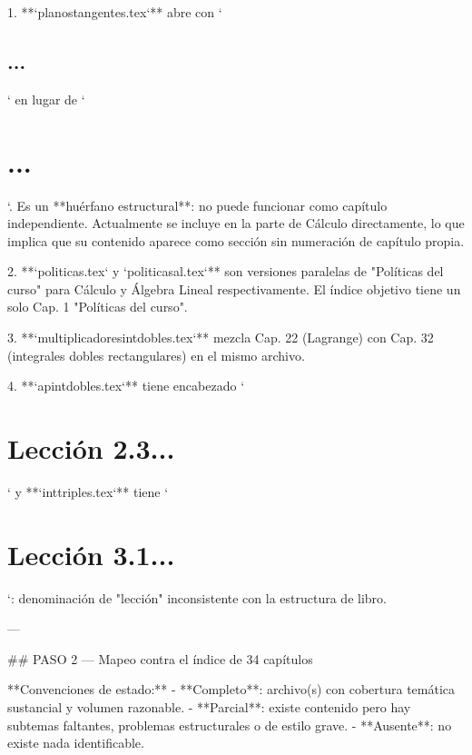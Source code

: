 1. **`planostangentes.tex`** abre con `\section{...}` en lugar de `\chapter{...}`. Es un **huérfano estructural**: no puede funcionar como capítulo independiente. Actualmente se incluye en la parte de Cálculo directamente, lo que implica que su contenido aparece como sección sin numeración de capítulo propia.

2. **`politicas.tex` y `politicasal.tex`** son versiones paralelas de "Políticas del curso" para Cálculo y Álgebra Lineal respectivamente. El índice objetivo tiene un solo Cap. 1 "Políticas del curso".

3. **`multiplicadoresintdobles.tex`** mezcla Cap. 22 (Lagrange) con Cap. 32 (integrales dobles rectangulares) en el mismo archivo.

4. **`apintdobles.tex`** tiene encabezado `\chapter{Lección 2.3...}` y **`inttriples.tex`** tiene `\chapter{Lección 3.1...}`: denominación de "lección" inconsistente con la estructura de libro.

---

## PASO 2 — Mapeo contra el índice de 34 capítulos

**Convenciones de estado:**
- **Completo**: archivo(s) con cobertura temática sustancial y volumen razonable.
- **Parcial**: existe contenido pero hay subtemas faltantes, problemas estructurales o de estilo grave.
- **Ausente**: no existe nada identificable.

